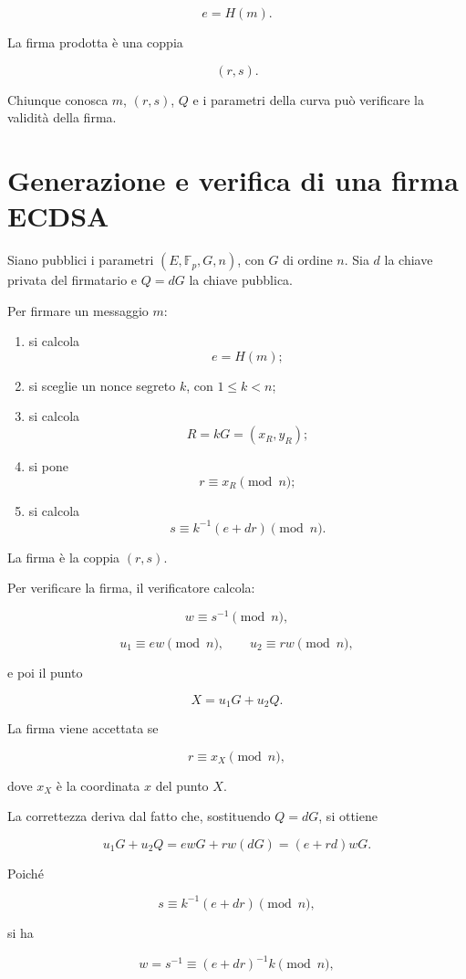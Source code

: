 \documentclass[12pt,a4paper,oneside]{report}
\begin{document}
\[
e=H(m).
\]

La firma prodotta è una coppia

\[
(r,s).
\]

Chiunque conosca \(m\), \((r,s)\), \(Q\) e i parametri della curva può verificare la validità della firma.

\section{Generazione e verifica di una firma ECDSA}

Siano pubblici i parametri \((E,\mathbb{F}_p,G,n)\), con \(G\) di ordine \(n\). Sia \(d\) la chiave privata del firmatario e \(Q=dG\) la chiave pubblica.

Per firmare un messaggio \(m\):

\begin{enumerate}
    \item si calcola
    \[
    e=H(m);
    \]
    \item si sceglie un nonce segreto \(k\), con \(1\leq k<n\);
    \item si calcola
    \[
    R=kG=(x_R,y_R);
    \]
    \item si pone
    \[
    r\equiv x_R \pmod n;
    \]
    \item si calcola
    \[
    s\equiv k^{-1}(e+dr)\pmod n.
    \]
\end{enumerate}

La firma è la coppia \((r,s)\).

Per verificare la firma, il verificatore calcola:

\[
w\equiv s^{-1}\pmod n,
\]

\[
u_1\equiv ew\pmod n,
\qquad
u_2\equiv rw\pmod n,
\]

e poi il punto

\[
X=u_1G+u_2Q.
\]

La firma viene accettata se

\[
r\equiv x_X \pmod n,
\]

dove \(x_X\) è la coordinata \(x\) del punto \(X\).

La correttezza deriva dal fatto che, sostituendo \(Q=dG\), si ottiene

\[
u_1G+u_2Q = ewG+rw(dG)=(e+rd)wG.
\]

Poiché

\[
s\equiv k^{-1}(e+dr)\pmod n,
\]

si ha

\[
w=s^{-1}\equiv (e+dr)^{-1}k \pmod n,
\]
\end{document}
